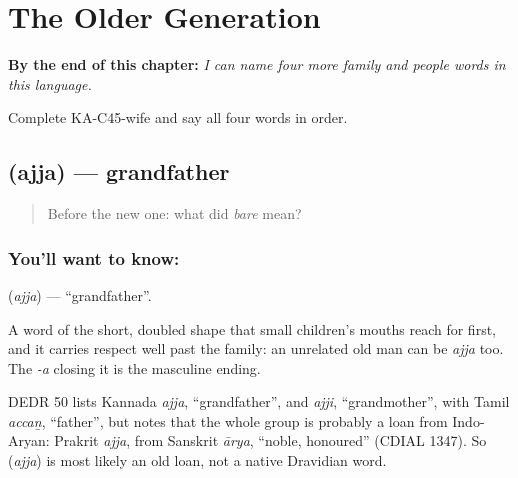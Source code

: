 
\chapter{The Older Generation}
\label{ch:ka-older-generation}

\begin{chapteropening}
\textbf{By the end of this chapter:} \emph{I can name four more family and people words in this language.}

Complete KA-C45-wife and say all four words in order.
\end{chapteropening}

\section[\texorpdfstring{\kn{ಅಜ್ಜ} (ajja)}{ಅಜ್ಜ (ajja)}]{ (ajja) — grandfather}

\label{lesson:KA-C45-grandfather}



\begin{quote}
Before the new one: what did \emph{bare} mean?
\end{quote}

\subsection*{You'll want to know: }
\textbf{} (\emph{ajja}) — \textquotedblleft{}grandfather\textquotedblright{}.

A word of the short, doubled shape that small children's mouths reach for first, and it carries respect well past the family: an unrelated old man can be \emph{ajja} too. The \emph{-a} closing it is the masculine ending.

\begin{cousinweb}
DEDR 50 lists Kannada \emph{ajja}, \textquotedblleft{}grandfather\textquotedblright{}, and \emph{ajji}, \textquotedblleft{}grandmother\textquotedblright{}, with Tamil \emph{accaṉ}, \textquotedblleft{}father\textquotedblright{}, but notes that the whole group is probably a loan from Indo-Aryan: Prakrit \emph{ajja}, from Sanskrit \emph{ārya}, \textquotedblleft{}noble, honoured\textquotedblright{} (CDIAL 1347). So \textbf{} (\emph{ajja}) is most likely an old loan, not a native Dravidian word.
\end{cousinweb}

